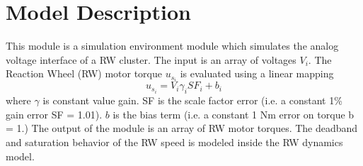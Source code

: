 \section{Model Description}
This module is a simulation environment module which simulates the analog voltage interface of a RW cluster.  The input is an array of voltages $V_{i}$.  The Reaction Wheel (RW) motor torque $u_{s_{i}}$ is evaluated using a linear mapping
\begin{equation}
u_{s_{i}} = V_{i} \gamma_{i} SF_{i} + b_{i}
\end{equation}
where $\gamma$ is constant value gain. SF is the scale factor error (i.e. a constant 1\% gain error SF = 1.01). $b$ is the bias term (i.e. a constant 1 Nm error on torque b = 1.)  The output of the module is an array of RW motor torques.  The deadband and saturation behavior of the RW speed is modeled inside the RW dynamics model.  